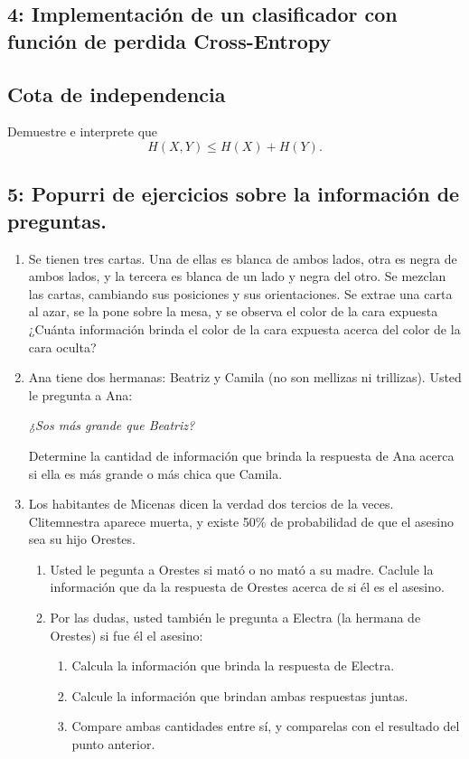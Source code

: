 \subsection*{4: Implementaci\'on de un clasificador con funci\'on de perdida Cross-Entropy}

\subsection*{Cota de independencia}
Demuestre e interprete que 
\begin{equation}
    H(X,Y) \leq H(X) + H(Y).
\end{equation}

\subsection*{5: Popurri de ejercicios sobre la informaci\'on de preguntas.}
\begin{enumerate}
    \item Se tienen tres cartas. Una de ellas es blanca de ambos lados, otra es negra de ambos lados, y la tercera es blanca de un lado y negra del otro. Se mezclan  las cartas, cambiando sus posiciones y sus orientaciones. Se extrae una carta al azar, se la pone sobre la mesa, y se observa el color de la cara expuesta ¿Cuánta información brinda el color de la cara expuesta acerca del color de la cara oculta?
    \item Ana tiene dos hermanas: Beatriz y Camila (no son mellizas ni trillizas). Usted le pregunta a Ana:
    \begin{center}
        {\it ¿Sos m\'as grande que Beatriz?}
    \end{center}
    Determine la cantidad de informaci\'on que brinda la respuesta de Ana acerca si ella es m\'as grande o m\'as chica que Camila.
    \item Los habitantes de Micenas dicen la verdad dos tercios de la veces. Clitemnestra aparece muerta, y existe 50\% de probabilidad de que el asesino sea su hijo Orestes.
    \begin{enumerate}
        \item Usted le pegunta a Orestes si mat\'o o no mat\'o a su madre. Caclule la informaci\'on que da la respuesta de Orestes acerca de si \'el es el asesino.
        \item Por las dudas, usted tambi\'en le pregunta a Electra (la hermana de Orestes) si fue \'el el asesino:
        \begin{enumerate}
            \item Calcula la informaci\'on que brinda la respuesta de Electra.
            \item Calcule la informaci\'on que brindan ambas respuestas juntas.
            \item Compare ambas cantidades entre s\'i, y comparelas con el resultado del punto anterior.
        \end{enumerate}
    \end{enumerate}
\end{enumerate}
